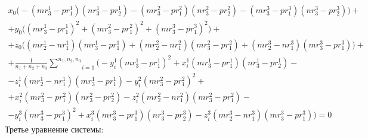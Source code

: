 $$\begin{gathered}
	x_0 \bigg( -(m r_3^1 - p r_1^1) (n r_3^1 - p r_2^1) - (m r_3^2 - p r_1^2) (n r_3^2 - p r_2^2) - (m r_3^3 - p r_1^3) (n r_3^3 - p r_2^3) \bigg) + \\
	+ y_0 \bigg( (m r_3^1 - p r_1^1)^2 + (m r_3^2 - p r_1^2)^2 + (m r_3^3 - p r_1^3)^2 \bigg) + \\
	+ z_0 \bigg( (m r_2^1 - n r_1^1) (m r_3^1 - p r_1^1) + (m r_2^2 - n r_1^2) (m r_3^2 - p r_1^2) + (m r_2^3 - n r_1^3) (m r_3^3 - p r_1^3) \bigg) + \\
	+ \frac{1}{n_1+n_2+n_3} \underset{i=1}{\overset{n_1, n_2, n_3}{\sum}} \bigg( 
		- y_i^1 (m r_3^1 - p r_1^1)^2
		+ x_i^1 (m r_3^1 - p r_1^1) (n r_3^1 - p r_2^1) - \\
		- z_i^1  (m r_2^1 - n r_1^1) (m r_3^1 - p r_1^1)
		- y_i^2 (m r_3^2 - p r_1^2)^2 + \\
		+ x_i^2  (m r_3^2 - p r_1^2) (n r_3^2 - p r_2^2)
		- z_i^2 (m r_2^2 - n r_1^2) (m r_3^2 - p r_1^2) - \\
		- y_i^3 (m r_3^3 - p r_1^3)^2
		+ x_i^3 (m r_3^3 - p r_1^3) (n r_3^3 - p r_2^3)
		- z_i^3 (m r_2^3 - n r_1^3) (m r_3^3 - p r_1^3)
	 \bigg) = 0
\end{gathered}$$
Третье уравнение системы:
